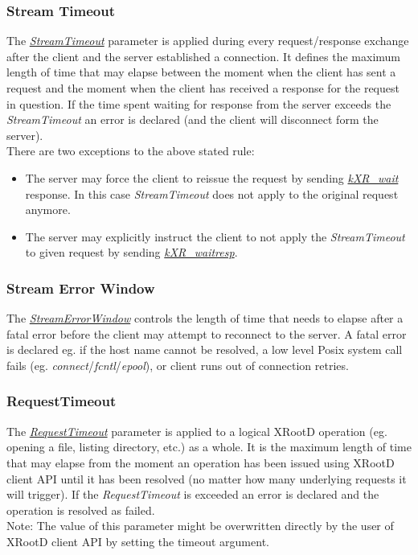 \documentclass{article}
\begin{document}
		\subsubsection{Stream Timeout}
			The \hyperref[env:streamtimeout]{\textit{StreamTimeout}} parameter is applied during every request/response exchange after 
			the client and the server established a connection. It defines the maximum length of time that may elapse between the moment 
			when the client has sent a request and the moment when the client has received a response for the request in question. If the 
			time spent waiting for response from the server exceeds the \textit{StreamTimeout} an error is declared (and the client will 
			disconnect form the server). \\
			There are two exceptions to the above stated rule:
			\begin{itemize}
			  \item The server may force the client to reissue the request by sending \href{http://xrootd.org/doc/dev49/XRdv400.htm#_Toc517297831}
			  		{\textit{kXR_wait}} response. In this case \textit{StreamTimeout} does not apply to the original request anymore. 
			  \item The server may explicitly instruct the client to not apply the \textit{StreamTimeout} to given request by sending
			  	    \href{http://xrootd.org/doc/dev49/XRdv400.htm#_Toc517297832}{\textit{kXR_waitresp}}.
			\end{itemize} 
		
		\subsubsection{Stream Error Window}
			The \hyperref[env:streamerrorwindow]{\textit{StreamErrorWindow}} controls the length of time that needs to elapse after a 
			fatal error before the client may attempt to reconnect to the server. A fatal error is declared eg. if the host name cannot be 
			resolved, a low level Posix system call fails (eg. \textit{connect}/\textit{fcntl}/\textit{epool}), or client runs out of connection 
			retries. 
		
		\subsubsection{RequestTimeout}
			The \hyperref[env:requesttimeout]{\textit{RequestTimeout}} parameter is applied to a logical XRootD operation (eg. opening a file, 
			listing directory, etc.) as a whole. It is the maximum length of time that may elapse from the moment an operation has been issued 
			using XRootD client API until it has been resolved (no matter how many underlying requests it will trigger). If the \textit{RequestTimeout} 
			is exceeded an error is declared and the operation is resolved as failed. \\ 
			Note: The value of this parameter might be overwritten directly by the user of XRootD client API by setting the timeout argument.
			
\end{document}
